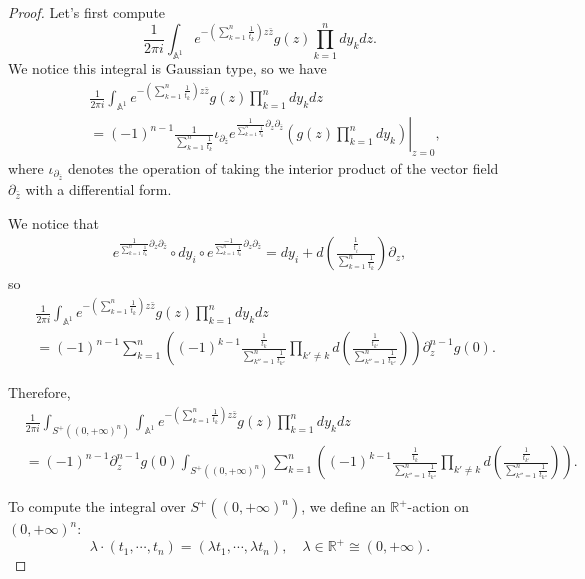 \documentclass[11pt]{amsart}
\theoremstyle{definition}
\theoremstyle{remark}
\numberwithin{equation}{section}
\begin{document}
\begin{proof}
    Let's first compute
    $$
    \frac{1}{2\pi i}\int_{\mathbb{A}^{1}}e^{-\left(\sum_{k=1}^{n}\frac{1}{t_{k}}\right)z\bar{z}}g(z)\prod_{k=1}^{n}dy_{k}dz.
    $$
We notice this integral is Gaussian type, so we have 
\begin{align*}
   & \frac{1}{2\pi i}\int_{\mathbb{A}^{1}}e^{-\left(\sum_{k=1}^{n}\frac{1}{t_{k}}\right)z\bar{z}}g(z)\prod_{k=1}^{n}dy_{k}dz\\
   &=(-1)^{n-1}\left.\frac{1}{\sum_{k=1}^{n}\frac{1}{t_{k}}}\iota_{\partial_{\bar{z}}}e^{\frac{1}{\sum_{k=1}^{n}\frac{1}{t_{k}}}\partial_{z}\partial_{\bar{z}}}\left(g(z)\prod_{k=1}^{n}dy_{k}\right)\right|_{z=0},
\end{align*}
where $\iota_{\partial_{\bar{z}}}$ denotes the operation of taking the interior product of the vector field $\partial_{\bar{z}}$ with a differential form.

We notice that
\begin{align*}
    e^{\frac{1}{\sum_{k=1}^{n}\frac{1}{t_{k}}}\partial_{z}\partial_{\bar{z}}}\circ dy_{i}\circ e^{\frac{-1}{\sum_{k=1}^{n}\frac{1}{t_{k}}}\partial_{z}\partial_{\bar{z}}}=dy_{i}+d(\frac{\frac{1}{t_{i}}}{\sum_{k=1}^{n}\frac{1}{t_{k}}})\partial_{z},
\end{align*}
so
\begin{align*}
    &\frac{1}{2\pi i}\int_{\mathbb{A}^{1}}e^{-\left(\sum_{k=1}^{n}\frac{1}{t_{k}}\right)z\bar{z}}g(z)\prod_{k=1}^{n}dy_{k}dz\\
    &=
    (-1)^{n-1}\sum_{k=1}^{n}\left((-1)^{k-1}\frac{\frac{1}{t_{k}}}{\sum_{k''=1}^{n}\frac{1}{t_{k''}}}\prod_{k'\neq k}d(\frac{\frac{1}{t_{k'}}}{\sum_{k''=1}^{n}\frac{1}{t_{k''}}})\right)\partial_{z}^{n-1}g(0).
\end{align*}

Therefore, 
\begin{align*}
     &\frac{1}{2\pi i}\int_{S^{+}((0,+\infty)^n)}\int_{\mathbb{A}^{1}}e^{-\left(\sum_{k=1}^{n}\frac{1}{t_{k}}\right)z\bar{z}}g(z)\prod_{k=1}^{n}dy_{k}dz\\
     &=
     (-1)^{n-1}\partial_{z}^{n-1}g(0)\int_{S^{+}((0,+\infty)^n)}\sum_{k=1}^{n}\left((-1)^{k-1}\frac{\frac{1}{t_{k}}}{\sum_{k''=1}^{n}\frac{1}{t_{k''}}}\prod_{k'\neq k}d(\frac{\frac{1}{t_{k'}}}{\sum_{k''=1}^{n}\frac{1}{t_{k''}}})\right).
\end{align*}

To compute the integral over $S^{+}((0,+\infty)^n)$, we define an $\mathbb{R}^{+}$-action on $(0,+\infty)^n$:
$$
\lambda\cdot (t_{1},\cdots,t_{n})=(\lambda t_{1},\cdots,\lambda t_{n}),\quad \lambda\in \mathbb{R}^{+}\cong(0,+\infty).
$$


\end{proof}
\end{document}
